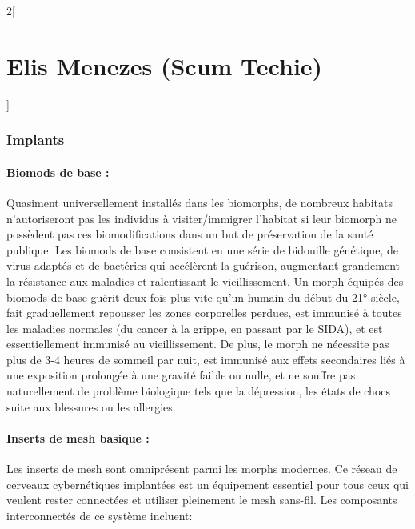 \documentclass[a4paper,9pt]{article}
\begin{document}
\begin{multicols}{2}[\section*{Elis Menezes (Scum Techie)}]
   \subsubsection*{Implants}

   \paragraph{Biomods de base :} 
   Quasiment universellement  installés dans les biomorphs, de nombreux habitats
   n'autoriseront pas les individus à visiter/immigrer l'habitat si leur biomorph
   ne possèdent pas ces biomodifications dans un but de préservation de la santé
   publique. Les biomods de base consistent en une série de bidouille génétique,
   de virus adaptés et de bactéries qui accélèrent la guérison, augmentant
   grandement la résistance aux maladies et ralentissant le vieillissement. Un
   morph équipés des biomods de base guérit deux fois plus vite qu'un humain du
   début du 21° siècle, fait graduellement repousser les zones corporelles
   perdues, est immunisé à toutes les maladies normales (du cancer à la grippe, en
   passant par le SIDA), et est essentiellement immunisé au vieillissement. De
   plus, le morph ne nécessite pas plus de 3-4 heures de sommeil par nuit, est
   immunisé aux effets secondaires liés à une exposition prolongée à une gravité
   faible ou nulle, et ne souffre pas naturellement de problème biologique tels
   que la dépression, les états de chocs suite aux blessures ou les allergies.

   \paragraph{Inserts de mesh basique :} 
   Les inserts de mesh sont omniprésent parmi les morphs modernes. Ce réseau de
   cerveaux cybernétiques implantées est un équipement essentiel pour tous ceux
   qui veulent rester connectées et utiliser pleinement le mesh sans-fil. Les
   composants interconnectés de ce système incluent: 


\end{multicols}
\end{document}
